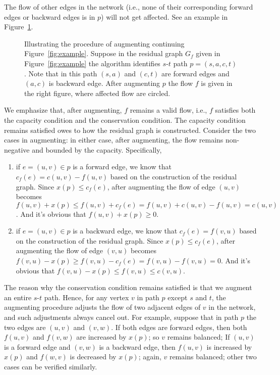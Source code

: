 The flow of other edges in the network (i.e., none of their corresponding
forward edges or backward edges is in $p$) will not get affected. See an
example in Figure~\ref{fig:augment}.

\begin{figure}[h]
\centering{}
\caption{Illustrating the procedure of augmenting continuing Figure~\ref{fig:example}. Suppose
in the residual graph $G_f$ given in Figure~\ref{fig:example} the algorithm identifies $s$-$t$
path $p = (s,a,c,t)$. Note that in this path $(s,a)$ and $(c,t)$ are forward
edges and $(a, c)$ is backward edge. After augmenting $p$ the flow $f$ is given in the right figure,
where affected flow are circled.}
\label{fig:augment}
\end{figure}

We emphasize that, after augmenting, $f$ remains a valid flow, i.e., $f$ satisfies
both the capacity condition and the conservation condition. The capacity
condition remains satisfied owes to how the residual graph is constructed.
Consider the two cases in augmenting: in either case, after augmenting, the
flow remains non-negative and bounded by the capacity. Specifically,

\vspace*{-\topsep}
\begin{enumerate}
\item if $e=(u,v)\in p$ is a forward edge, we know that $c_f(e)=c(u,v)-f(u,v)$ based on the
construction of the residual graph. Since $x( p) \le c_f (e)$, after augmenting the
flow of edge $(u, v)$ becomes $f(u, v) + x(p) \le f(u,v)+c_f (e) = f(u,v)+c(u,v)- f(u,v) = c(u,v)$. 
And it’s obvious that $f(u,v)+x(p) \ge 0$.
\item if $e=(u,v)\in p$ is a backward edge, we know that $c_f(e)=f(v,u)$ based on the
construction of the residual graph. Since $x(p) \le c_f(e)$, after augmenting the
flow of edge $(v, u)$ becomes $f(v, u) - x(p) \ge f(v,u)-c_f (e) = f(v,u)-f(v,u) = 0$. 
And it’s obvious that $f(v,u)-x(p) \le f(v,u) \le c(v,u)$.
\end{enumerate}

The reason why the conservation condition remains satisfied is that we augment an entire $s$-$t$ path. Hence,
for any vertex $v$ in path $p$ except $s$ and $t$, the augmenting procedure adjusts the
flow of two adjacent edges of $v$ in the network, and such adjustments always
cancel out. For example, suppose that in path $p$ the two edges are $(u,v)$ and
$(v,w)$. If both edges are forward edges, then both $f(u,v)$ and $f(v,w)$ are
increased by $x(p)$; so $v$ remains balanced; If $(u, v)$ is a forward edge and $(v,
		w)$ is a backward edge, then $f (u, v)$ is increased by $x(p)$ and $f(w,v)$ is
decreased by $x(p)$; again, $v$ remains balanced; other two cases can be verified
similarly.

